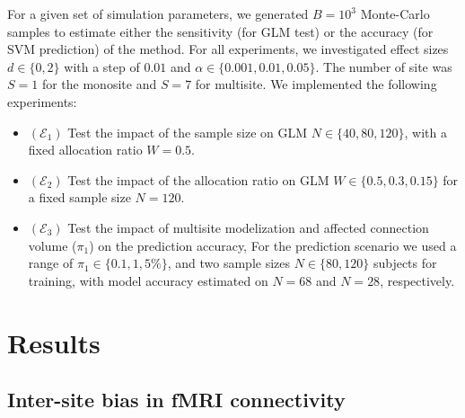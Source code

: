 \documentclass[authoryear]{elsarticle}
\begin{document}
For a given set of simulation parameters, we generated $B=10^3$ Monte-Carlo samples to estimate either the sensitivity (for GLM test) or the accuracy (for SVM prediction) of the method. For all experiments, we investigated effect sizes $d\in\{0,2\}$ with a step of $0.01$ and $\alpha\in\{0.001,0.01,0.05\}$. The number of site was $S=1$ for the monosite and $S=7$ for multisite. We implemented the following experiments:

\begin{itemize}
 \item $(\mathcal{E}_1)$ Test the impact of the sample size on GLM $N\in\{40,80,120\}$, with a fixed allocation ratio $W=0.5$.
 \item $(\mathcal{E}_2)$ Test the impact of the allocation ratio on GLM $W\in\{0.5,0.3,0.15\}$ for a fixed sample size $N=120$.
 \item $(\mathcal{E}_3)$ Test the impact of multisite modelization and affected connection volume ($\pi_1$) on the prediction accuracy, For the prediction scenario we used a range of $\pi_1\in\{0.1,1,5\%\}$, and two sample sizes $N\in\{80,120\}$ subjects for training, with model accuracy estimated on $N=68$ and $N=28$, respectively.
\end{itemize}


\section{Results}

\subsection{Inter-site bias in fMRI connectivity}
\end{document}
